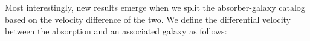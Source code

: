 \documentclass[iop]{emulateapj-rtx4}
\begin{document}




%

Most interestingly, new results emerge when we split the absorber-galaxy catalog based on the velocity difference of the two. We define the differential velocity between the absorption and an associated galaxy as follows:
\end{document}
